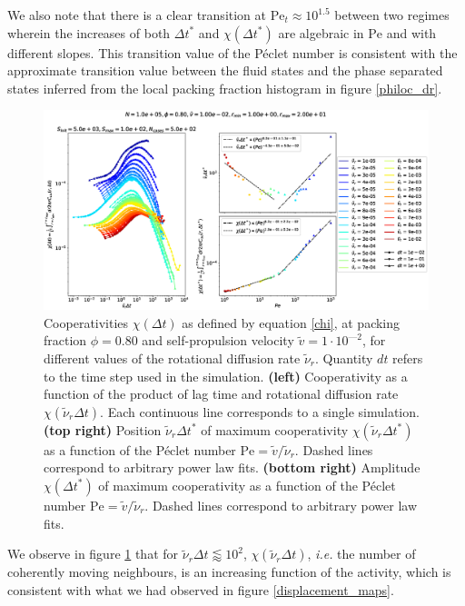 \documentclass[class=report, float=false, crop=false]{standalone}
\begin{document}
We also note that there is a clear transition at $\text{Pe}_t \approx 10^{1.5}$ between two regimes wherein the increases of both $\Delta t^*$ and $\chi(\Delta t^*)$ are algebraic in $\text{Pe}$ and with different slopes. This transition value of the P\'eclet number is consistent with the approximate transition value between the fluid states and the phase separated states inferred from the local packing fraction histogram in figure \ref{philoc_dr}.\\

\begin{figure}[h!]
\centering
\includegraphics[width=\textwidth]{figures/figs/intCuu_Dk8000_Vj1000_Nq1000_Io5000_Mn1000_Cn5000_RMINl1000_RMAXm2000.eps}
\caption{Cooperativities $\chi(\Delta t)$ as defined by equation \ref{chi}, at packing fraction $\phi = 0.80$ and self-propulsion velocity $\tilde{v} = 1\cdot10^{—2}$, for different values of the rotational diffusion rate $\tilde{\nu}_r$. Quantity $dt$ refers to the time step used in the simulation. \textbf{(left)} Cooperativity as a function of the product of lag time and rotational diffusion rate $\chi(\tilde{\nu}_r \Delta t)$. Each continuous line corresponds to a single simulation. \textbf{(top right)} Position $\tilde{\nu}_r \Delta t^*$ of maximum cooperativity $\chi(\tilde{\nu}_r \Delta t^*)$ as a function of the P\'eclet number $\text{Pe} = \tilde{v}/\tilde{\nu}_r$. Dashed lines correspond to arbitrary power law fits. \textbf{(bottom right)} Amplitude $\chi(\Delta t^*)$ of maximum cooperativity as a function of the P\'eclet number $\text{Pe} = \tilde{v}/\tilde{\nu}_r$. Dashed lines correspond to arbitrary power law fits.}
\label{chi_dr}
\end{figure}

We observe in figure \ref{chi_dr} that for $\tilde{\nu}_r \Delta t \lessapprox 10^2$, $\chi(\tilde{\nu}_r \Delta t)$, \textit{i.e.} the number of coherently moving neighbours, is an increasing function of the activity, which is consistent with what we had observed in figure \ref{displacement_maps}.\\
\end{document}
